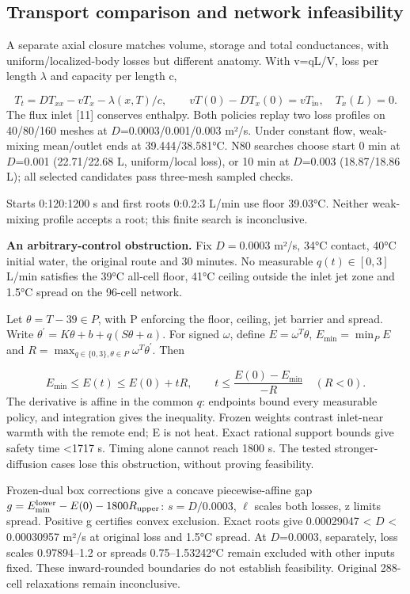 \documentclass[12pt,a4paper]{article}
\begin{document}
\subsection{Transport comparison and network infeasibility}
A separate axial closure matches volume, storage and total conductances, with uniform/localized-body losses but different anatomy. With v=qL/V, loss per length $\lambda$ and capacity per length c,

\begin{equation}T_t=D T_{xx}-vT_x-\lambda(x,T)/c,\qquad vT(0)-DT_x(0)=vT_{\mathrm in},\quad T_x(L)=0.\end{equation}
The flux inlet [11] conserves enthalpy. Both policies replay two loss profiles on 40/80/160 meshes at $D$=0.0003/0.001/0.003 m²/s. Under constant flow, weak-mixing mean/outlet ends at 39.444/38.581°C. N80 searches choose start 0 min at $D$=0.001 (22.71/22.68 L, uniform/local loss), or 10 min at $D$=0.003 (18.87/18.86 L); all selected candidates pass three-mesh sampled checks.

Starts 0:120:1200 s and first roots 0:0.2:3 L/min use floor 39.03°C. Neither weak-mixing profile accepts a root; this finite search is inconclusive.

\textbf{An arbitrary-control obstruction.} Fix $D=0.0003$ m²/s, 34°C contact, 40°C initial water, the original route and 30 minutes. No measurable $q(t)\in[0,3]$ L/min satisfies the 39°C all-cell floor, 41°C ceiling outside the inlet jet zone and 1.5°C spread on the 96-cell network.

Let $\theta=T-39\in P$, with P enforcing the floor, ceiling, jet barrier and spread. Write $\theta^{\prime}=K\theta+b+q(S\theta+a)$. For signed $\omega$, define $E=\omega^T\theta$, $E_{\min}=\min_P E$ and $R=\max_{q\in\{0,3\},\theta\in P}\omega^T\theta^{\prime}$. Then

\begin{equation}E_{\min}\le E(t)\le E(0)+tR,\qquad t\le\frac{E(0)-E_{\min}}{-R}\quad(R<0).\end{equation}
The derivative is affine in the common $q$: endpoints bound every measurable policy, and integration gives the inequality. Frozen weights contrast inlet-near warmth with the remote end; E is not heat. Exact rational support bounds give safety time <1717 s. Timing alone cannot reach 1800 s. The tested stronger-diffusion cases lose this obstruction, without proving feasibility.

Frozen-dual box corrections give a concave piecewise-affine gap $g=E_{\min}^{\rm lower}-E(0)-1800R_{\rm upper}$: $s=D/0.0003$, $\ell$ scales both losses, z limits spread. Positive g certifies convex exclusion. Exact roots give 0.00029047 < $D$ < 0.00030957 m²/s at original loss and 1.5°C spread. At $D$=0.0003, separately, loss scales 0.97894–1.2 or spreads 0.75–1.53242°C remain excluded with other inputs fixed. These inward-rounded boundaries do not establish feasibility. Original 288-cell relaxations remain inconclusive.
\end{document}
